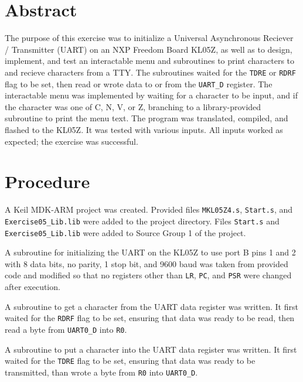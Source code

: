 \documentclass[CMPE]{KGCOEReport}
\begin{document}
\maketitle

\section*{Abstract}

The purpose of this exercise was to initialize a Universal Asynchronous
Reciever / Transmitter (UART) on an NXP Freedom Board KL05Z, as well as to
design, implement, and test an interactable menu and subroutines to print
characters to and recieve characters from a TTY. The subroutines waited for the
\texttt{TDRE} or \texttt{RDRF} flag to be set, then read or wrote data to or
from the \texttt{UART\_D} register. The interactable menu was implemented by
waiting for a character to be input, and if the character was one of C, N, V,
or Z, branching to a library-provided subroutine to print the menu text. The
program was translated, compiled, and flashed to the KL05Z. It was tested with
various inputs. All inputs worked as expected; the exercise was successful.

\section*{Procedure}

A Keil MDK-ARM project was created. Provided files \texttt{MKL05Z4.s},
\texttt{Start.s}, and \linebreak \texttt{Exercise05\_Lib.lib} were added to the project
directory. Files \texttt{Start.s} and \linebreak \texttt{Exercise05\_Lib.lib} were added
to Source Group 1 of the project.

A subroutine for initializing the UART on the KL05Z to use port B pins 1 and 2
with 8 data bits, no parity, 1 stop bit, and 9600 baud was taken from provided
code and modified so that no registers other than \texttt{LR}, \texttt{PC}, and
\texttt{PSR} were changed after execution.

A subroutine to get a character from the UART data register was written. It
first waited for the \texttt{RDRF} flag to be set, ensuring that data was ready
to be read, then read a byte from \texttt{UART0\_D} into \texttt{R0}.

A subroutine to put a character into the UART data register was written. It
first waited for the \texttt{TDRE} flag to be set, ensuring that data was ready
to be transmitted, than wrote a byte from \texttt{R0} into \texttt{UART0\_D}.
\end{document}
